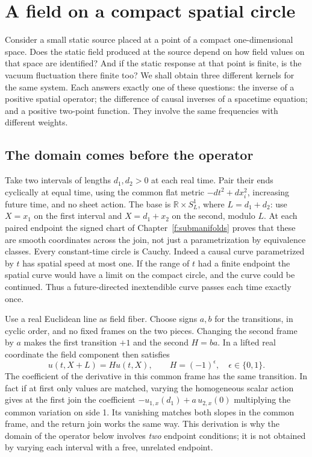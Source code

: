 \chapter{A field on a compact spatial circle}\label{f:capstone}
Consider a small static source placed at a point of a compact one-dimensional space. Does the static field produced at the source depend on how field values on that space are identified? And if the static response at that point is finite, is the vacuum fluctuation there finite too? We shall obtain three different kernels for the same system. Each answers exactly one of these questions: the inverse of a positive spatial operator; the difference of causal inverses of a spacetime equation; and a positive two-point function. They involve the same frequencies with different weights.

\section{The domain comes before the operator}
Take two intervals of lengths $d_1,d_2>0$ at each real time. Pair their ends cyclically at equal time, using the common flat metric $-dt^2+dx_i^2$, increasing future time, and no sheet action. The base is $\mathbb R\times S^1_L$, where $L=d_1+d_2$: use $X=x_1$ on the first interval and $X=d_1+x_2$ on the second, modulo $L$. At each paired endpoint the signed chart of Chapter~\ref{f:submanifolds} proves that these are smooth coordinates across the join, not just a parametrization by equivalence classes. Every constant-time circle is Cauchy. Indeed a causal curve parametrized by $t$ has spatial speed at most one. If the range of $t$ had a finite endpoint the spatial curve would have a limit on the compact circle, and the curve could be continued. Thus a future-directed inextendible curve passes each time exactly once.

Use a real Euclidean line as field fiber. Choose signs $a,b$ for the transitions, in cyclic order, and no fixed frames on the two pieces. Changing the second frame by $a$ makes the first transition $+1$ and the second $H=ba$. In a lifted real coordinate the field component then satisfies
\begin{equation}
 u(t,X+L)=H u(t,X),\qquad H=(-1)^\epsilon,\quad \epsilon\in\{0,1\}.\label{f:twist-domain}
\end{equation}
The coefficient of the derivative in this common frame has the same transition. In fact if at first only values are matched, varying the homogeneous scalar action gives at the first join the coefficient $-u_{1,x}(d_1)+a\,u_{2,x}(0)$ multiplying the common variation on side 1. Its vanishing matches both slopes in the common frame, and the return join works the same way. This derivation is why the domain of the operator below involves \emph{two} endpoint conditions; it is not obtained by varying each interval with a free, unrelated endpoint.

